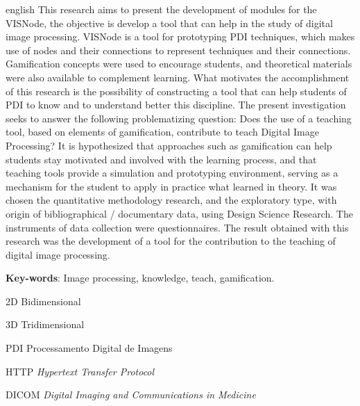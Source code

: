 \documentclass[
	12pt,				%
	oneside,			%
	a4paper,			%
	english,			%
	french,				%
	spanish,			%
	brazil,				%
	]{abntex2}
\begin{document}
\begin{resumo}[ABSTRACT]
 \begin{otherlanguage*}{english}
This research aims to present the development of modules for the VISNode, the objective is develop a tool that can help in the study of digital image processing. VISNode is a tool for prototyping PDI techniques, which makes use of nodes and their connections to represent techniques and their connections. Gamification concepts were used to encourage students, and theoretical materials were also available to complement learning. What motivates the accomplishment of this research is the possibility of constructing a tool that can help students of PDI to know and to understand better this discipline. The present investigation seeks to answer the following problematizing question: Does the use of a teaching tool, based on elements of gamification, contribute to teach Digital Image Processing? It is hypothesized that approaches such as gamification can help students stay motivated and involved with the learning process, and that teaching tools provide a simulation and prototyping environment, serving as a mechanism for the student to apply in practice what learned in theory. It was chosen the quantitative methodology  research, and the exploratory type, with origin of bibliographical / documentary data, using Design Science Research. The instruments of data collection were questionnaires. The result obtained with this research was the development of a tool for the contribution to the teaching of digital image processing.

   \vspace{\onelineskip}
 
   \noindent 
   \textbf{Key-words}: Image processing, knowledge, teach, gamification.
 \end{otherlanguage*}
\end{resumo}


\listoffigures*
\cleardoublepage

\listoftables*
\cleardoublepage

\begin{siglas}
  \item[2D] Bidimensional
  \item[3D] Tridimensional
  \item[PDI] Processamento Digital de Imagens
  \item[HTTP] \textit{Hypertext Transfer Protocol}
  \item[DICOM] \textit{Digital Imaging and Communications in Medicine}
\end{siglas}
\end{document}
